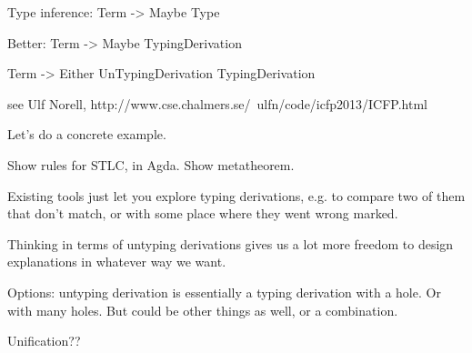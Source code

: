 \documentclass[xcolor=svgnames,12pt,aspectratio=169]{beamer}
\newcommand{\ty}[3]{{#1} \vdash {#2} : {#3}}
\newenvironment{xframe}[1][]
  {\begin{frame}[fragile,environment=xframe,#1]}
  {\end{frame}}
\begin{document}
\begin{xframe}{}
\end{xframe}

\begin{xframe}{}
  Type inference: Term -> Maybe Type

  Better: Term -> Maybe TypingDerivation

  Term -> Either UnTypingDerivation TypingDerivation

  see Ulf Norell,
  http://www.cse.chalmers.se/~ulfn/code/icfp2013/ICFP.html
\end{xframe}

\begin{xframe}
  Let's do a concrete example.

  Show rules for STLC, in Agda.  Show metatheorem.
\end{xframe}

\begin{xframe}
  Existing tools just let you explore typing derivations, e.g. to
  compare two of them that don't match, or with some place where they
  went wrong marked.

  Thinking in terms of untyping derivations gives us a lot more
  freedom to design explanations in whatever way we want.

  Options: untyping derivation is essentially a typing derivation with
  a hole.  Or with many holes.  But could be other things as well, or
  a combination.
\end{xframe}

\begin{xframe}
  Unification??
\end{xframe}
\end{document}
